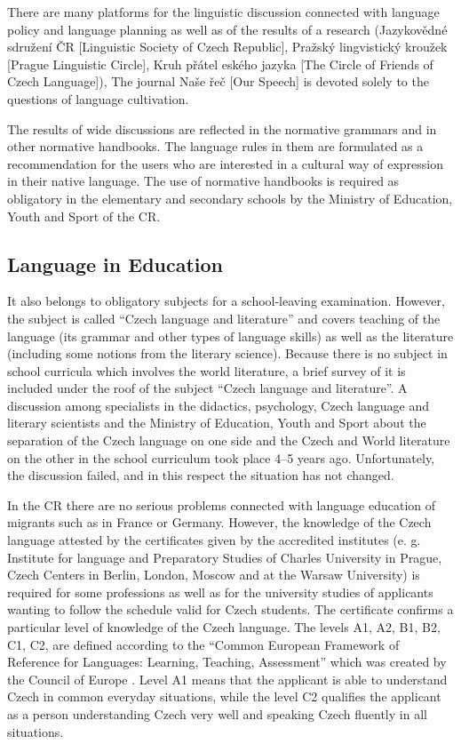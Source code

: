 \begin{multicols}{2}
There are many platforms for the linguistic discussion connected with language policy and language planning as well as of the results of a research (Jazykovědné sdružení ČR [Linguistic Society of Czech Republic], Pražský lingvistický kroužek {[}Prague Linguistic Circle{]}, Kruh přátel
eského jazyka {[}The Circle of Friends of Czech Language{]}), The journal Naše řeč [Our Speech] is devoted solely to the questions of language cultivation.

The results of wide discussions are reflected in the normative grammars and in other normative handbooks. The language rules in them are formulated as a recommendation for the users who are interested in a cultural way of expression in their native language. The use of normative handbooks is required as obligatory in the elementary and secondary schools by the Ministry of Education, Youth and Sport of the CR.


\subsection{Language in Education}

 It also belongs to obligatory subjects for a school-leaving examination. However, the subject is called “Czech language and literature” and covers teaching of the language (its grammar and other types of language skills) as well as the literature (including some notions from the literary science).  Because there is no subject in school curricula which involves the world literature, a brief survey of it is included under the roof of the subject “Czech language and literature”. A discussion among specialists in the didactics, psychology, Czech language and literary scientists and the Ministry of Education, Youth and Sport about the separation of the Czech language on one side and the Czech and World literature on the other in the school curriculum took place 4--5 years ago. Unfortunately, the discussion failed, and in this respect the situation has not changed.

In the CR there are no serious problems connected with language education of migrants such as in France or Germany. However, the knowledge of the Czech language attested by the certificates given by the accredited institutes (e. g. Institute for language and Preparatory Studies of Charles University in Prague, Czech Centers in Berlin, London, Moscow and at the Warsaw University) is required for some professions as well as for the university studies of applicants wanting to follow the schedule valid for Czech students. The certificate confirms a particular level of knowledge of the Czech language.  The levels A1, A2, B1, B2, C1, C2, are defined according to the “Common European Framework of Reference for Languages: Learning, Teaching, Assessment” which was created by the Council of Europe \cite{Note7}. Level A1 means that the applicant is able to understand Czech in common everyday situations, while the level C2 qualifies the applicant as a person understanding Czech very well and speaking Czech fluently in all situations.


\end{multicols}
